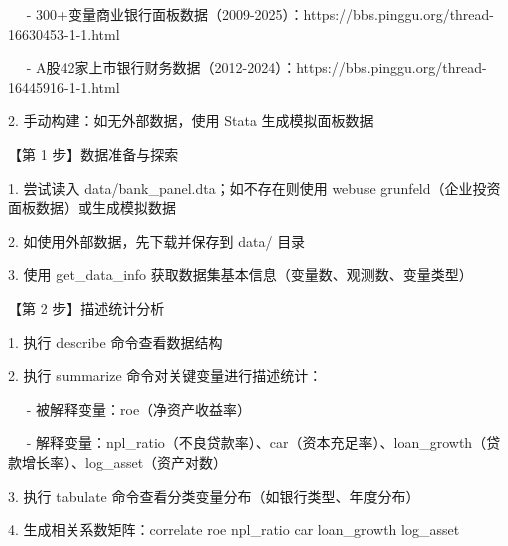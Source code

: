 \documentclass[
  american,
  chinese,
]{ctexart}
\begin{document}
\foreignlanguage{american}{{~~ }- 300+}{变量商业银行面板数据（}\foreignlanguage{american}{2009-2025}{）：}\foreignlanguage{american}{https://bbs.pinggu.org/thread-16630453-1-1.html}

\foreignlanguage{american}{{~~ }- A}{股}\foreignlanguage{american}{42}{家上市银行财务数据（}\foreignlanguage{american}{2012-2024}{）：}\foreignlanguage{american}{https://bbs.pinggu.org/thread-16445916-1-1.html}

\foreignlanguage{american}{2. }{手动构建：如无外部数据，使用}\foreignlanguage{american}{ Stata }{生成模拟面板数据}\foreignlanguage{american}{}

{【第}\foreignlanguage{american}{ 1 }{步】数据准备与探索}\foreignlanguage{american}{}

\foreignlanguage{american}{1. }{尝试读入}\foreignlanguage{american}{ data/{bank\_panel.dta}}{；如不存在则使用}\foreignlanguage{american}{ {webuse} {grunfeld}}{（企业投资面板数据）或生成模拟数据}\foreignlanguage{american}{}

\foreignlanguage{american}{2. }{如使用外部数据，先下载并保存到}\foreignlanguage{american}{ data/ }{目录}\foreignlanguage{american}{}

\foreignlanguage{american}{3. }{使用}\foreignlanguage{american}{ {get\_data\_info} }{获取数据{集基本}信息（变量数、观测数、变量类型）}\foreignlanguage{american}{}

{【第}\foreignlanguage{american}{ 2 }{步】描述统计分析}\foreignlanguage{american}{}

\foreignlanguage{american}{1. }{执行}\foreignlanguage{american}{ describe }{命令查看数据结构}\foreignlanguage{american}{}

\foreignlanguage{american}{2. }{执行}\foreignlanguage{american}{ summarize }{命令对关键变量进行描述统计：}\foreignlanguage{american}{}

\foreignlanguage{american}{{~~ }- }{被解释变量：}\foreignlanguage{american}{roe}{（净资产收益率）}\foreignlanguage{american}{}

\foreignlanguage{american}{{~~ }- }{解释变量：}{\foreignlanguage{american}{npl\_ratio}}{（不良贷款率）、}\foreignlanguage{american}{car}{（资本充足率）、}{\foreignlanguage{american}{loan\_growth}}{（贷款增长率）、}{\foreignlanguage{american}{log\_asset}}{（资产对数）}\foreignlanguage{american}{}

\foreignlanguage{american}{3. }{执行}\foreignlanguage{american}{ tabulate }{命令查看分类变量分布（如银行类型、年度分布）}\foreignlanguage{american}{}

\foreignlanguage{american}{4. }{生成相关系数矩阵：}\foreignlanguage{american}{correlate roe
{npl\_ratio} car {loan\_growth} {log\_asset}}
\end{document}
